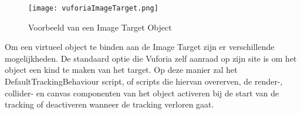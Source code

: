 \begin{figure}
    \texttt{[image: vuforiaImageTarget.png]}
    \caption{Voorbeeld van een Image Target Object}
    \label{fig:vuforiaImageTarget}
\end{figure}

Om een virtueel object te binden aan de Image Target zijn er verschillende mogelijkheden. De standaard optie die Vuforia zelf aanraad op zijn site is om het object een kind te maken van het target. Op deze manier zal het DefaultTrackingBehaviour script, of scripts die hiervan overerven, de render-, collider- en canvas componenten van het object activeren bij de start van de tracking of deactiveren wanneer de tracking verloren gaat.

